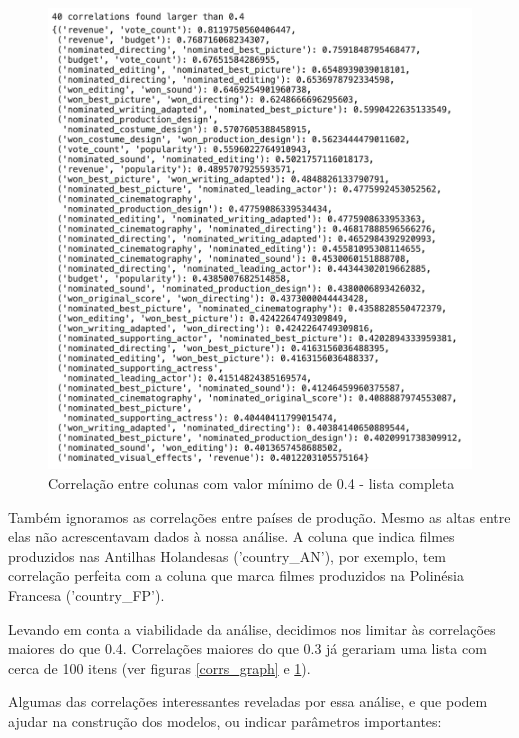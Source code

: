             \begin{figure}[htb]
            	\caption{\label{corrs0.4}Correlação entre colunas com valor mínimo de 0.4 - lista completa}
            	\begin{center}
            		\includegraphics[scale=0.7]{corrs0.4.png}
            	\end{center}
            \end{figure}

            Também ignoramos as correlações entre países de produção. Mesmo as altas entre elas não acrescentavam dados à nossa análise. A coluna que indica filmes produzidos nas Antilhas Holandesas ('country\_AN'), por exemplo, tem correlação perfeita com a coluna que marca filmes produzidos na Polinésia Francesa ('country\_FP').\par

            Levando em conta a viabilidade da análise, decidimos nos limitar às correlações maiores do que 0.4. Correlações maiores do que 0.3 já gerariam uma lista com cerca de 100 itens (ver figuras \ref{corrs_graph} e \ref{corrs0.4}). \par

            Algumas das correlações interessantes reveladas por essa análise, e que podem ajudar na construção dos modelos, ou indicar parâmetros importantes:

